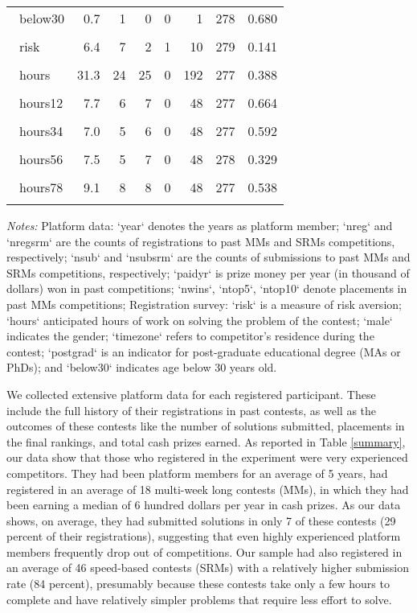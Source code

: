\documentclass[10pt, titlepage]{article}
\begin{document}
\begin{table}
\begin{tabular}{@{}lrrrrrrr}
   \\[-1.86ex]~below30 & 0.7 & 1 & 0 & 0 & 1 & 278 & 0.680 \\ 
   \\[-1.86ex]~risk & 6.4 & 7 & 2 & 1 & 10 & 279 & 0.141 \\ 
   \\[-1.86ex]~hours & 31.3 & 24 & 25 & 0 & 192 & 277 & 0.388 \\ 
   \\[-1.86ex]~hours12 & 7.7 & 6 & 7 & 0 & 48 & 277 & 0.664 \\ 
   \\[-1.86ex]~hours34 & 7.0 & 5 & 6 & 0 & 48 & 277 & 0.592 \\ 
   \\[-1.86ex]~hours56 & 7.5 & 5 & 7 & 0 & 48 & 278 & 0.329 \\ 
   \\[-1.86ex]~hours78 & 9.1 & 8 & 8 & 0 & 48 & 277 & 0.538 \\ 
   \hline\\[-1.8ex]
\end{tabular}
\begin{minipage}{\textwidth}
\footnotesize\emph{Notes:}{ Platform data: `year` denotes the years as platform member; `nreg` and `nregsrm` are the counts of registrations to past MMs and SRMs competitions, respectively; `nsub` and `nsubsrm` are the counts of submissions to past MMs and SRMs competitions, respectively; `paidyr` is prize money per year (in thousand of dollars) won in past competitions; `nwins`, `ntop5`, `ntop10` denote placements in past MMs competitions; Registration survey: `risk` is a measure of risk aversion; `hours` anticipated hours of work on solving the problem of the contest; `male` indicates the gender; `timezone` refers to competitor's residence during the contest; `postgrad` is an indicator for post-graduate educational degree (MAs or PhDs); and `below30` indicates age below 30 years old.
}\end{minipage}
\end{table}

We collected extensive platform data for each registered participant.
These include the full history of their registrations in past contests,
as well as the outcomes of these contests like the number of solutions
submitted, placements in the final rankings, and total cash prizes
earned. As reported in Table \ref{summary}, our data show that those who
registered in the experiment were very experienced competitors. They had
been platform members for an average of 5 years, had registered in an
average of 18 multi-week long contests (MMs), in which they had been
earning a median of 6 hundred dollars per year in cash prizes. As our
data shows, on average, they had submitted solutions in only 7 of these
contests (29 percent of their registrations), suggesting that even
highly experienced platform members frequently drop out of competitions.
Our sample had also registered in an average of 46 speed-based contests
(SRMs) with a relatively higher submission rate (84 percent), presumably
because these contests take only a few hours to complete and have
relatively simpler problems that require less effort to solve.
\end{document}
